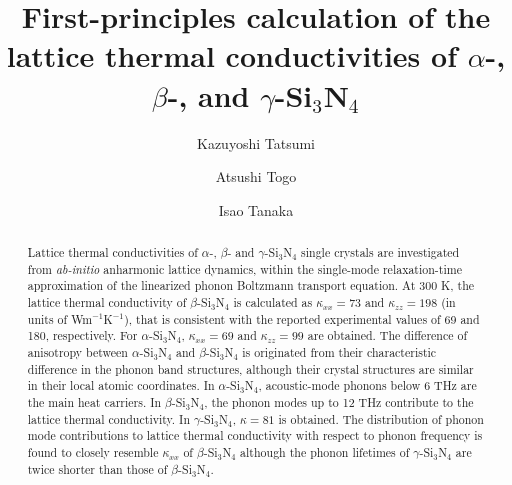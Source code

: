 \documentclass[twocolumn,amsmath,amssymb,a4paper,prb,superscriptaddress,floatfix]{revtex4-1}
\begin{document}
\title{First-principles calculation of the lattice thermal
conductivities of $\alpha$-, $\beta$-, and $\gamma$-Si$_3$N$_4$}

\author{Kazuyoshi Tatsumi} 

\author{Atsushi Togo}

\author{Isao Tanaka}

\begin{abstract}
Lattice thermal conductivities of $\alpha$-, $\beta$- and $\gamma$-Si$_3$N$_4$
single crystals are investigated from {\it ab-initio} anharmonic lattice
dynamics, within the single-mode relaxation-time approximation of the
linearized phonon Boltzmann transport equation. At 300 K, the lattice thermal
conductivity of $\beta$-Si$_3$N$_4$ is calculated as $\kappa_{xx}=73$ and
$\kappa_{zz}=198$ (in units of Wm$^{-1}$K$^{-1}$), that is consistent with the
reported experimental values of 69 and 180, respectively. For
$\alpha$-Si$_3$N$_4$, $\kappa_{xx}=69$ and $\kappa_{zz}=99$ are obtained.  The
difference of anisotropy between $\alpha$-Si$_3$N$_4$ and $\beta$-Si$_3$N$_4$
is originated from their characteristic difference in the phonon band
structures, although their crystal structures are similar in their local atomic
coordinates. In $\alpha$-Si$_3$N$_4$, acoustic-mode phonons below 6 THz are the
main heat carriers. In $\beta$-Si$_3$N$_4$, the phonon modes up to 12 THz
contribute to the lattice thermal conductivity. In $\gamma$-Si$_3$N$_4$,
$\kappa=81$ is obtained. The distribution of phonon mode contributions to
lattice thermal conductivity with respect to phonon frequency is found to
closely resemble $\kappa_{xx}$ of $\beta$-Si$_3$N$_4$ although the phonon
lifetimes of $\gamma$-Si$_3$N$_4$ are twice shorter than those of
$\beta$-Si$_3$N$_4$.
\end{abstract}
\end{document}
